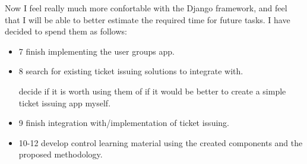 \documentclass[12pt]{article}
\begin{document}
Now I feel really much more confortable with the Django framework, and feel that I will be able to better
estimate the required time for future tasks. I have decided to spend them as follows:

\begin{itemize}
  \item 7 finish implementing the user groups app.
  \item 8 search for existing ticket issuing solutions to integrate with.
  
    decide if it is worth using them of if it would be better to create a simple ticket issuing app myself.
    
  \item 9 finish integration with/implementation of ticket issuing.
  \item 10-12 develop control learning material using the created components and the proposed methodology.
\end{itemize}

\newpage

\end{document}
